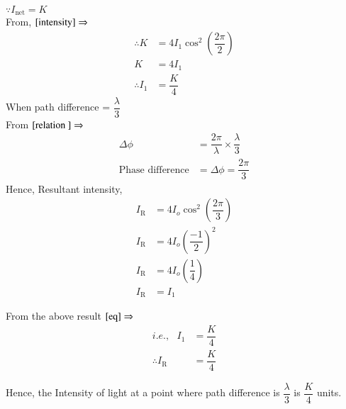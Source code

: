 \documentclass[journal,12pt,twocolumn]{IEEEtran}
\theoremstyle{remark}
\begin{document}
$\because I_{\text{net}} = K$ \\
From, $\eqref{intensity} \Rightarrow$
\begin{align}
   \therefore K &= 4I_1\cos^2\left(\dfrac{2\pi}{2}\right) \nonumber \\
    K &= 4I_1 \nonumber \\
 \therefore    I_1&=\dfrac{K}{4} \label{eq}
\end{align}
When path difference = $\dfrac{\lambda}{3}$ \\
From $\eqref{relation } \Rightarrow$
\begin{align}
\Delta \phi &= \dfrac{2\pi}{\lambda}  \times  \dfrac{\lambda}{3} \nonumber \\
\text{Phase difference} &=  \Delta \phi = \dfrac{2\pi}{3}
\end{align}
Hence,
\hspace*{0.5cm}Resultant intensity,
\begin{align}
I_{\text{R}} &= 4I_o\cos^2\left(\dfrac{2\pi}{3}\right) \nonumber  \\
I_{\text{R}} &= 4I_o\left(\dfrac{-1}{2}\right)^2\nonumber \\
I_{\text{R}} &= 4I_o\left(\dfrac{1}{4}\right)\nonumber \\
I_{\text{R}} &= I_1
\end{align}

From the above result $ \eqref{eq} \Rightarrow$
\hspace*{0.5cm}
\begin{align}
i.e.,  \,\,\,\, I_1 &= \dfrac{K}{4} \nonumber \\
\therefore I_{\text{R}} &= \dfrac{K}{4} 
\end{align}

Hence, the Intensity of light at a point where path difference is $\dfrac{\lambda}{3}$ is $\dfrac{K}{4}$ units.


\end{document}
